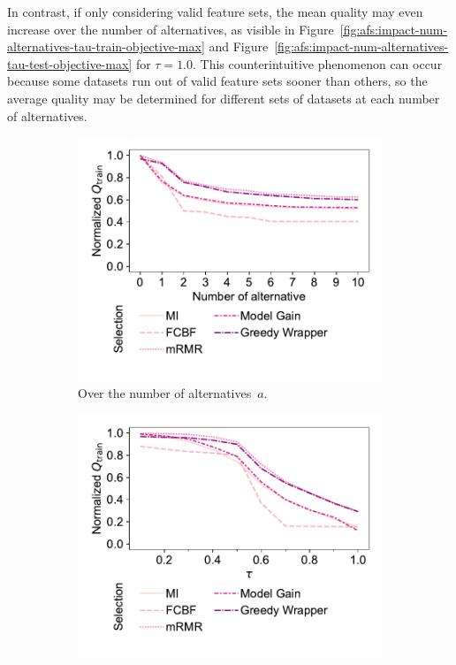 \documentclass[iicol, sn-basic, Numbered]{sn-jnl} %
\theoremstyle{plain}
\theoremstyle{definition}
\begin{document}
In contrast, if only considering valid feature sets, the mean quality may even increase over the number of alternatives, as visible in Figure~\ref{fig:afs:impact-num-alternatives-tau-train-objective-max} and Figure~\ref{fig:afs:impact-num-alternatives-tau-test-objective-max} for $\tau=1.0$.
This counterintuitive phenomenon can occur because some datasets run out of valid feature sets sooner than others, so the average quality may be determined for different sets of datasets at each number of alternatives.

\begin{figure}[t]
	\centering
	\begin{subfigure}[t]{0.49\textwidth}
		\centering
		\includegraphics[width=\textwidth, trim=15 30 10 10, clip]{plots/afs-impact-num-alternatives-fs-method-train-objective-max-fillna.pdf}
		\caption{
			Over the number of alternatives~$a$.
		}
		\label{fig:afs:impact-num-alternatives-fs-method-train-objective-max-fillna}
	\end{subfigure}
	\hfill
	\begin{subfigure}[t]{0.49\textwidth}
		\centering
		\includegraphics[width=\textwidth, trim=15 30 10 10, clip]{plots/afs-impact-tau-fs-method-train-objective-max-fillna.pdf}

\end{subfigure}
\end{figure}
\end{document}

